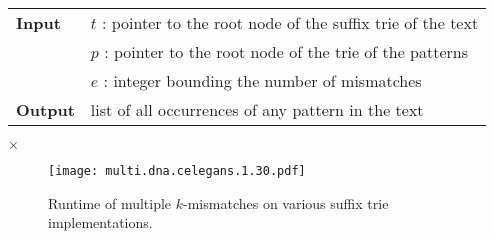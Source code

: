 \begin{center}
\begin{minipage}[t]{.8\textwidth}
\begin{algorithm}[H]
\begin{tabular}{ll}
\textbf{Input}  & $t$ : pointer to the root node of the suffix trie of the text\\
 			    & $p$ : pointer to the root node of the trie of the patterns\\
 			    & $e$ : integer bounding the number of mismatches\\
\textbf{Output} & list of all occurrences of any pattern in the text\\
\end{tabular}
\begin{algorithmic}[1]
		\State \Report {} $\times$ 
		\Repeat
			\Repeat
				\State {}
	\EndIf
\EndIf
\end{algorithmic}
\label{alg:st-hamming-multi}
\end{algorithm}
\end{minipage}
\end{center}

\begin{figure}[h]
\begin{center}
\caption[Multiple $k$-mismatches runtime]{Runtime of multiple $k$-mismatches on various suffix trie implementations.}
\label{fig:query-dna-apx-multi}
\texttt{[image: multi.dna.celegans.1.30.pdf]}
\end{center}
\end{figure}

